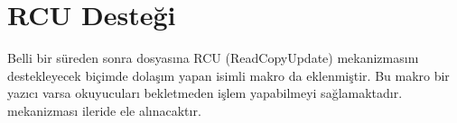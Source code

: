 \documentclass[a4paper,10pt,turkish]{sphinxmanual}
\begin{document}
\begin{sphinxVerbatim}[commandchars=\\\{\}]



\end{sphinxVerbatim}


\section{RCU Desteği}
\label{\detokenize{kernellinkedlistandhashtable:rcu-destegi}}
\sphinxAtStartPar
Belli bir süreden sonra  dosyasına RCU (Read\sphinxhyphen{}Copy\sphinxhyphen{}Update) mekanizmasını destekleyecek biçimde
dolaşım yapan  isimli makro da eklenmiştir. Bu makro bir yazıcı varsa okuyucuları
bekletmeden işlem yapabilmeyi sağlamaktadır.  mekanizması ileride ele alınacaktır.
\end{document}
